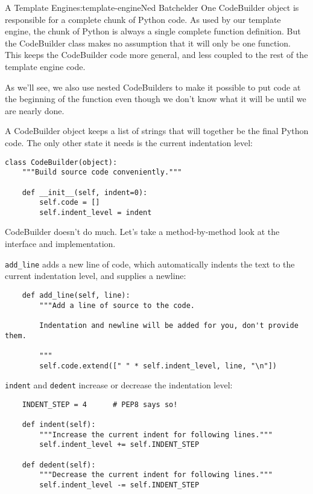 \begin{aosachapter}{A Template Engine}{s:template-engine}{Ned Batchelder}
One CodeBuilder object is responsible for a complete chunk of Python
code. As used by our template engine, the chunk of Python is always a
single complete function definition. But the CodeBuilder class makes no
assumption that it will only be one function. This keeps the CodeBuilder
code more general, and less coupled to the rest of the template engine
code.

As we'll see, we also use nested CodeBuilders to make it possible to put
code at the beginning of the function even though we don't know what it
will be until we are nearly done.

A CodeBuilder object keeps a list of strings that will together be the
final Python code. The only other state it needs is the current
indentation level:

\begin{verbatim}
class CodeBuilder(object):
    """Build source code conveniently."""

    def __init__(self, indent=0):
        self.code = []
        self.indent_level = indent
\end{verbatim}

CodeBuilder doesn't do much. Let's take a method-by-method look at the
interface and implementation.

\texttt{add\_line} adds a new line of code, which automatically indents
the text to the current indentation level, and supplies a newline:

\begin{verbatim}
    def add_line(self, line):
        """Add a line of source to the code.

        Indentation and newline will be added for you, don't provide them.

        """
        self.code.extend([" " * self.indent_level, line, "\n"])
\end{verbatim}

\texttt{indent} and \texttt{dedent} increase or decrease the indentation
level:

\begin{verbatim}
    INDENT_STEP = 4      # PEP8 says so!

    def indent(self):
        """Increase the current indent for following lines."""
        self.indent_level += self.INDENT_STEP

    def dedent(self):
        """Decrease the current indent for following lines."""
        self.indent_level -= self.INDENT_STEP
\end{verbatim}


\end{aosachapter}
